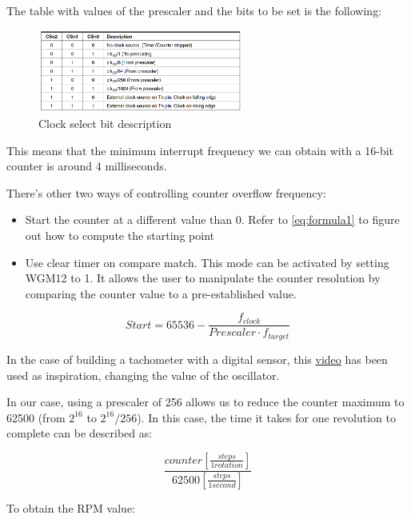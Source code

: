 \documentclass[a4paper]{article}
\begin{document}
The table with values of the prescaler and the bits to be set is the following:

\begin{figure}[h!]
	\centering
	\includegraphics[width = 0.6\textwidth]{CSn.png}
	\caption{Clock select bit description}
	\label{fig:CSn}
\end{figure}

This means that the minimum interrupt frequency we can obtain with a 16-bit counter is around 4 milliseconds. 


There's other two ways of controlling counter overflow frequency:

\begin{itemize}
	\item Start the counter at a different value than 0. Refer to \autoref{eq:formula1} to figure out how to compute the starting point
	\item Use clear timer on compare match. This mode can be activated by setting WGM12 to 1. It allows the user to manipulate the counter resolution by comparing the counter value to a pre-established value.
\end{itemize}


\begin{equation}
	Start = 65536 - \frac{f_{clock}}{Prescaler\cdot f_{target}}
	\label{eq:formula1}
\end{equation}


In the case of building a tachometer with a digital sensor, this \hyperref{https://www.youtube.com/watch?v=6QZMt4yyylU}{category}{name}{video} has been used as inspiration, changing the value of the oscillator.

In our case, using a prescaler of 256 allows us to reduce the counter maximum to 62500 (from $2^{16}$ to $2^{16}/256$).
In this case, the time it takes for one revolution to complete can be described as:

\begin{equation}
	\frac{counter [\frac{steps}{1rotation}]}{62500 [\frac{steps}{1second}]}
\end{equation} 

To obtain the RPM value:
\end{document}
